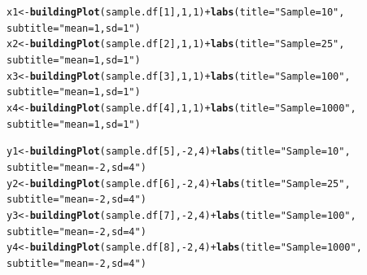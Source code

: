 \documentclass{article}\usepackage[]{graphicx}\usepackage[]{color}
\makeatletter
\newcommand{\hlnum}[1]{\textcolor[rgb]{0.686,0.059,0.569}{#1}}%
\newcommand{\hlstr}[1]{\textcolor[rgb]{0.192,0.494,0.8}{#1}}%
\newcommand{\hlopt}[1]{\textcolor[rgb]{0,0,0}{#1}}%
\newcommand{\hlstd}[1]{\textcolor[rgb]{0.345,0.345,0.345}{#1}}%
\newcommand{\hlkwb}[1]{\textcolor[rgb]{0.69,0.353,0.396}{#1}}%
\newcommand{\hlkwc}[1]{\textcolor[rgb]{0.333,0.667,0.333}{#1}}%
\newcommand{\hlkwd}[1]{\textcolor[rgb]{0.737,0.353,0.396}{\textbf{#1}}}%
\newenvironment{kframe}{%
 \def\at@end@of@kframe{}%
 \ifinner\ifhmode%
  \def\at@end@of@kframe{\end{minipage}}%
  \begin{minipage}{\columnwidth}%
 \fi\fi%
 \def\FrameCommand##1{\hskip\@totalleftmargin \hskip-\fboxsep
 \colorbox{shadecolor}{##1}\hskip-\fboxsep
     \hskip-\linewidth \hskip-\@totalleftmargin \hskip\columnwidth}%
 \MakeFramed {\advance\hsize-\width
   \@totalleftmargin\z@ \linewidth\hsize
   \@setminipage}}%
 {\par\unskip\endMakeFramed%
 \at@end@of@kframe}
\newenvironment{knitrout}{}{} %
\makeatother
\begin{document}
\begin{enumerate}
\begin{enumerate}
\begin{knitrout}
\begin{kframe}
\begin{alltt}
        \hlstd{x1}\hlkwb{<-}\hlkwd{buildingPlot}\hlstd{(sample.df[}\hlnum{1}\hlstd{],} \hlnum{1}\hlstd{,} \hlnum{1}\hlstd{)}\hlopt{+}\hlkwd{labs}\hlstd{(}\hlkwc{title}\hlstd{=}\hlstr{"Sample=10"}\hlstd{,}
                                                  \hlkwc{subtitle} \hlstd{=} \hlstr{"mean=1, sd=1"}\hlstd{)}
        \hlstd{x2}\hlkwb{<-}\hlkwd{buildingPlot}\hlstd{(sample.df[}\hlnum{2}\hlstd{],} \hlnum{1}\hlstd{,} \hlnum{1}\hlstd{)}\hlopt{+}\hlkwd{labs}\hlstd{(}\hlkwc{title}\hlstd{=}\hlstr{"Sample=25"}\hlstd{,}
                                                  \hlkwc{subtitle} \hlstd{=} \hlstr{"mean=1, sd=1"}\hlstd{)}
        \hlstd{x3}\hlkwb{<-}\hlkwd{buildingPlot}\hlstd{(sample.df[}\hlnum{3}\hlstd{],} \hlnum{1}\hlstd{,} \hlnum{1}\hlstd{)}\hlopt{+}\hlkwd{labs}\hlstd{(}\hlkwc{title}\hlstd{=}\hlstr{"Sample=100"}\hlstd{,}
                                                  \hlkwc{subtitle} \hlstd{=} \hlstr{"mean=1, sd=1"}\hlstd{)}
        \hlstd{x4}\hlkwb{<-}\hlkwd{buildingPlot}\hlstd{(sample.df[}\hlnum{4}\hlstd{],} \hlnum{1}\hlstd{,} \hlnum{1}\hlstd{)}\hlopt{+}\hlkwd{labs}\hlstd{(}\hlkwc{title}\hlstd{=}\hlstr{"Sample=1000"}\hlstd{,}
                                                  \hlkwc{subtitle} \hlstd{=} \hlstr{"mean=1, sd=1"}\hlstd{)}

        \hlstd{y1}\hlkwb{<-}\hlkwd{buildingPlot}\hlstd{(sample.df[}\hlnum{5}\hlstd{],} \hlopt{-}\hlnum{2}\hlstd{,} \hlnum{4}\hlstd{)}\hlopt{+}\hlkwd{labs}\hlstd{(}\hlkwc{title}\hlstd{=}\hlstr{"Sample=10"}\hlstd{,}
                                                  \hlkwc{subtitle} \hlstd{=} \hlstr{"mean=-2, sd=4"}\hlstd{)}
        \hlstd{y2}\hlkwb{<-}\hlkwd{buildingPlot}\hlstd{(sample.df[}\hlnum{6}\hlstd{],} \hlopt{-}\hlnum{2}\hlstd{,} \hlnum{4}\hlstd{)}\hlopt{+}\hlkwd{labs}\hlstd{(}\hlkwc{title}\hlstd{=}\hlstr{"Sample=25"}\hlstd{,}
                                                  \hlkwc{subtitle} \hlstd{=} \hlstr{"mean=-2, sd=4"}\hlstd{)}
        \hlstd{y3}\hlkwb{<-}\hlkwd{buildingPlot}\hlstd{(sample.df[}\hlnum{7}\hlstd{],} \hlopt{-}\hlnum{2}\hlstd{,} \hlnum{4}\hlstd{)}\hlopt{+}\hlkwd{labs}\hlstd{(}\hlkwc{title}\hlstd{=}\hlstr{"Sample=100"}\hlstd{,}
                                                  \hlkwc{subtitle} \hlstd{=} \hlstr{"mean=-2, sd=4"}\hlstd{)}
        \hlstd{y4}\hlkwb{<-}\hlkwd{buildingPlot}\hlstd{(sample.df[}\hlnum{8}\hlstd{],} \hlopt{-}\hlnum{2}\hlstd{,} \hlnum{4}\hlstd{)}\hlopt{+}\hlkwd{labs}\hlstd{(}\hlkwc{title}\hlstd{=}\hlstr{"Sample=1000"}\hlstd{,}
                                                  \hlkwc{subtitle} \hlstd{=} \hlstr{"mean=-2, sd=4"}\hlstd{)}


\end{alltt}
\end{kframe}
\end{knitrout}
\end{enumerate}
\end{enumerate}
\end{document}
